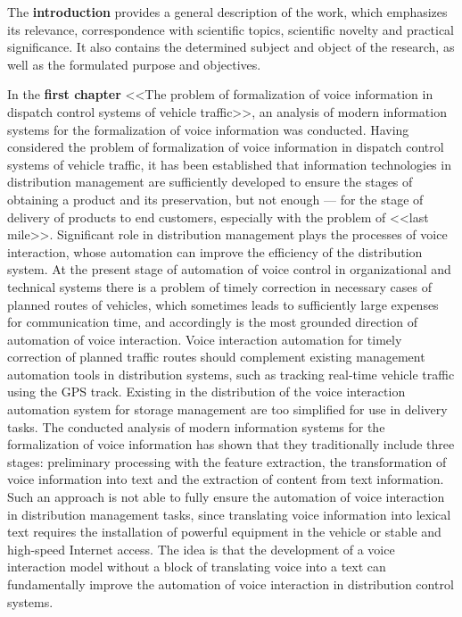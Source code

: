 The \textbf{introduction} provides a general description of the work, which emphasizes its relevance, correspondence with scientific topics, scientific novelty and practical significance. It also contains the determined subject and object of the research, as well as the formulated purpose and objectives.

In the \textbf{first chapter} <<The problem of formalization of voice information in dispatch control systems of vehicle traffic>>, an analysis of modern information systems for the formalization of voice information was conducted.
Having considered the problem of formalization of voice information in dispatch control systems of vehicle traffic, it has been established that information technologies in distribution management are sufficiently developed to ensure the stages of obtaining a product and its preservation, but not enough --- for the stage of delivery of products to end customers, especially with the problem of <<last mile>>. Significant role in distribution management plays the processes of voice interaction, whose automation can improve the efficiency of the distribution system.
At the present stage of automation of voice control in organizational and technical systems there is a problem of timely correction in necessary cases of planned routes of vehicles, which sometimes leads to sufficiently large expenses for communication time, and accordingly is the most grounded direction of automation of voice interaction.
Voice interaction automation for timely correction of planned traffic routes should complement existing management automation tools in distribution systems, such as tracking real-time vehicle traffic using the GPS track. Existing in the distribution of the voice interaction automation system for storage management are too simplified for use in delivery tasks.
The conducted analysis of modern information systems for the formalization of voice information has shown that they traditionally include three stages: preliminary processing with the feature extraction, the transformation of voice information into text and the extraction of content from text information. Such an approach is not able to fully ensure the automation of voice interaction in distribution management tasks, since translating voice information into lexical text requires the installation of powerful equipment in the vehicle or stable and high-speed Internet access. The idea is that the development of a voice interaction model without a block of translating voice into a text can fundamentally improve the automation of voice interaction in distribution control systems.
